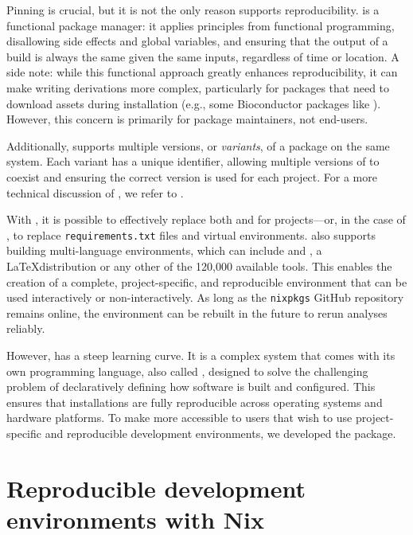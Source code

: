 \documentclass[
  article]{jss}
\begin{document}
Pinning is crucial, but it is not the only reason  supports
reproducibility.  is a functional package manager: it applies
principles from functional programming, disallowing side effects and
global variables, and ensuring that the output of a build is always the
same given the same inputs, regardless of time or location. A side note:
while this functional approach greatly enhances reproducibility, it can
make writing derivations more complex, particularly for packages that
need to download assets during installation (e.g., some Bioconductor
packages like ). However, this concern is primarily for
package maintainers, not end-users.

Additionally,  supports multiple versions, or \emph{variants},
of a package on the same system. Each variant has a unique identifier,
allowing multiple versions of  to coexist and ensuring the
correct version is used for each project. For a more technical
discussion of , we refer to \citet{dolstra2004nix}.

With , it is possible to effectively replace both 
and  for  projects---or, in the case of
, to replace \texttt{requirements.txt} files and
virtual environments.  also supports building multi-language
environments, which can include  and , a
\LaTeX distribution or any other of the 120,000 available tools. This
enables the creation of a complete, project-specific, and reproducible
environment that can be used interactively or non-interactively. As long
as the \texttt{nixpkgs} GitHub repository remains online, the
environment can be rebuilt in the future to rerun analyses reliably.

However,  has a steep learning curve. It is a complex system
that comes with its own programming language, also called
, designed to solve the challenging problem of
declaratively defining how software is built and configured. This
ensures that installations are fully reproducible across operating
systems and hardware platforms. To make  more accessible to
 users that wish to use project-specific and reproducible
development environments, we developed the  package.

\section{Reproducible development environments with
Nix}\label{sec-repro-nix}
\end{document}
